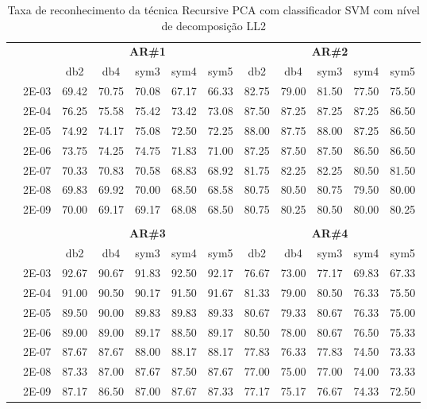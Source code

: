 \begin{table}[H]
	\centering
    \normalsize
	\caption{Taxa de reconhecimento da técnica Recursive PCA com classificador SVM com nível de decomposição LL2}
	\begin{tabular}{|c|c|c c c c c|c c c c c|}
\cline{3-12}
\multicolumn{2}{c|}{\multirow{2}{*}{}} & \multicolumn{5}{c|}{\textbf{AR\#1}}  & \multicolumn{5}{c|}{\textbf{AR\#2}} \\\cline{3-12}

\multicolumn{2}{c|}{}  & db2 & db4 & sym3 & sym4 & sym5 & db2 & db4& sym3 & sym4 & sym5 \\\hline
\multicolumn{1}{|c|}{ \multirow{6}{*}{\rotatebox[origin=c]{90}{\textbf{Gamma}}} }
&2E-03&	69.42&	70.75&	70.08&	67.17&	66.33&	82.75&	79.00&	81.50&	77.50&	75.50	\\\cline{2-12}
&2E-04&	76.25&	75.58&	75.42&	73.42&	73.08&	87.50&	87.25&	87.25&	87.25&	86.50	\\\cline{2-12}
&2E-05&	74.92&	74.17&	75.08&	72.50&	72.25&	88.00&	87.75&	88.00&	87.25&	86.50	\\\cline{2-12}
&2E-06&	73.75&	74.25&	74.75&	71.83&	71.00&	87.25&	87.50&	87.50&	86.50&	86.50	\\\cline{2-12}
&2E-07&	70.33&	70.83&	70.58&	68.83&	68.92&	81.75&	82.25&	82.25&	80.50&	81.50	\\\cline{2-12}
&2E-08&	69.83&	69.92&	70.00&	68.50&	68.58&	80.75&	80.50&	80.75&	79.50&	80.00	\\\cline{2-12}
&2E-09&	70.00&	69.17&	69.17&	68.08&	68.50&	80.75&	80.25&	80.50&	80.00&	80.25	



\\ \midrule
\multicolumn{12}{c}{}\\ 

\cline{3-12}
\multicolumn{2}{c}{} & \multicolumn{5}{|c|}{\textbf{AR\#3}}  & \multicolumn{5}{c|}{\textbf{AR\#4}} \\\cline{3-12}
\multicolumn{2}{c}{}  & \multicolumn{1}{|c}{db2} & db4 & sym3 & sym4 & sym5 & db2 & db4& sym3 & sym4 & sym5 \\\hline
\multicolumn{1}{|c|}{ \multirow{6}{*}{\rotatebox[origin=c]{90}{\textbf{Gamma}}} }
&2E-03&	92.67&	90.67&	91.83&	92.50&	92.17&	76.67&	73.00&	77.17&	69.83&	67.33	\\\cline{2-12}
&2E-04&	91.00&	90.50&	90.17&	91.50&	91.67&	81.33&	79.00&	80.50&	76.33&	75.50	\\\cline{2-12}
&2E-05&	89.50&	90.00&	89.83&	89.83&	89.33&	80.67&	79.33&	80.67&	76.33&	75.00	\\\cline{2-12}
&2E-06&	89.00&	89.00&	89.17&	88.50&	89.17&	80.50&	78.00&	80.67&	76.50&	75.33	\\\cline{2-12}
&2E-07&	87.67&	87.67&	88.00&	88.17&	88.17&	77.83&	76.33&	77.83&	74.50&	73.33	\\\cline{2-12}
&2E-08&	87.33&	87.00&	87.67&	87.50&	87.67&	77.00&	75.00&	77.00&	74.00&	73.33	\\\cline{2-12}
&2E-09&	87.17&	86.50&	87.00&	87.67&	87.33&	77.17&	75.17&	76.67&	74.33&	72.50	


\end{tabular}
\end{table}
